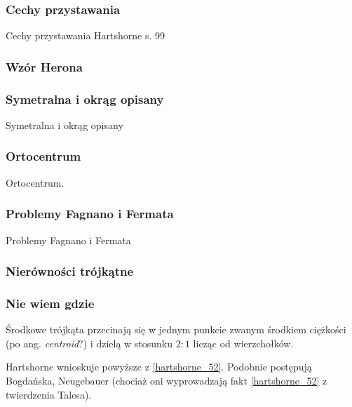 
\subsubsection{Cechy przystawania}
Cechy przystawania
\loremipsum
Hartshorne s. 99







\subsubsection{Wzór Herona}


\subsubsection{Symetralna i okrąg opisany}
Symetralna i okrąg opisany
\loremipsum

\subsubsection{Ortocentrum}
Ortocentrum.
\loremipsum

\subsubsection{Problemy Fagnano i Fermata}
Problemy Fagnano i Fermata
\loremipsum

\subsubsection{Nierówności trójkątne}


\subsubsection{Nie wiem gdzie}

\begin{proposition}
	\label{srodkowe_przecinaja_sie}
	Środkowe trójkąta przecinają się w jednym punkcie zwanym środkiem ciężkości (po ang. \emph{centroid}?) i dzielą w stosunku $2 : 1$ licząc od wierzchołków.
\end{proposition}

Hartshorne \cite[s. 53, 54]{hartshorne2000} wnioskuje powyższe z \ref{hartshorne_52}.
Podobnie postępują Bogdańska, Neugebauer (chociaż oni wyprowadzają fakt \ref{hartshorne_52} z twierdzenia Talesa).

